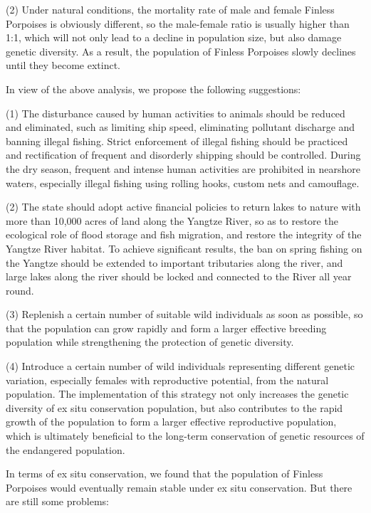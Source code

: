 \documentclass{mcmthesis}
\numberwithin{figure}{section}
\numberwithin{table}{section}
\numberwithin{equation}{section}
\begin{document}
\begin{memo}
  \par(2) Under natural conditions, the mortality rate of male and female Finless Porpoises is obviously different, so the male-female ratio is usually higher than 1:1, which will not only lead to a decline in population size, but also damage genetic diversity. As a result, the population of Finless Porpoises slowly declines until they become extinct.
  \par In view of the above analysis, we propose the following suggestions:
  \par(1) The disturbance caused by human activities to animals should be reduced and eliminated, such as limiting ship speed, eliminating pollutant discharge and banning illegal fishing. Strict enforcement of illegal fishing should be practiced and rectification of frequent and disorderly shipping should be controlled. During the dry season, frequent and intense human activities are prohibited in nearshore waters, especially illegal fishing using rolling hooks, custom nets and camouflage.
  \par(2) The state should adopt active financial policies to return lakes to nature with more than 10,000 acres of land along the Yangtze River, so as to restore the ecological role of flood storage and fish migration, and restore the integrity of the Yangtze River habitat. To achieve significant results, the ban on spring fishing on the Yangtze should be extended to important tributaries along the river, and large lakes along the river should be locked and connected to the River all year round.
  \par(3) Replenish a certain number of suitable wild individuals as soon as possible, so that the population can grow rapidly and form a larger effective breeding population while strengthening the protection of genetic diversity.
  \par(4) Introduce a certain number of wild individuals representing different genetic variation, especially females with reproductive potential, from the natural population. The implementation of this strategy not only increases the genetic diversity of ex situ conservation population, but also contributes to the rapid growth of the population to form a larger effective reproductive population, which is ultimately beneficial to the long-term conservation of genetic resources of the endangered population.
  \par In terms of ex situ conservation, we found that the 
  population of Finless Porpoises would eventually remain stable 
  under ex situ conservation. But there are still some problems: 

\end{memo}
\end{document}
